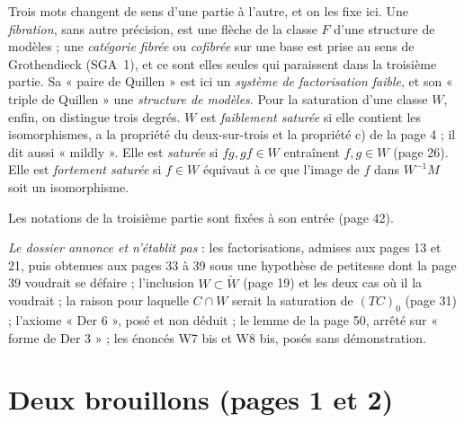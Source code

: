 \documentclass[11pt,a4paper]{article}
\begin{document}
Trois mots changent de sens d'une partie à l'autre, et on les fixe ici. Une
\emph{fibration}, sans autre précision, est une flèche de la classe $F$ d'une
structure de modèles ; une \emph{catégorie fibrée} ou \emph{cofibrée} sur une
base est prise au sens de Grothendieck (SGA~1), et ce sont elles seules qui
paraissent dans la troisième partie. Sa « paire de Quillen » est ici un
\emph{système de factorisation faible}, et son « triple de Quillen » une
\emph{structure de modèles}. Pour la saturation d'une classe $W$, enfin, on
distingue trois degrés. $W$ est \emph{faiblement saturée} si elle contient les
isomorphismes, a la propriété du deux-sur-trois et la propriété c) de la page
4 ; il dit aussi « mildly ». Elle est \emph{saturée} si $fg, gf \in W$
entraînent $f, g \in W$ (page 26). Elle est \emph{fortement saturée} si
$f \in W$ équivaut à ce que l'image de $f$ dans $W^{-1}M$ soit un
isomorphisme.

Les notations de la troisième partie sont fixées à son entrée (page 42).

\emph{Le dossier annonce et n'établit pas} : les factorisations, admises aux
pages 13 et 21, puis obtenues aux pages 33 à 39 sous une hypothèse de
petitesse dont la page 39 voudrait se défaire ; l'inclusion
$W \subset \widetilde W$ (page 19) et les deux cas où il la voudrait ; la
raison pour laquelle $C \cap W$ serait la saturation de $(TC)_0$ (page 31) ;
l'axiome « Der 6 », posé et non déduit ; le lemme de la page 50, arrêté sur
« forme de Der 3 » ; les énoncés W7 bis et W8 bis, posés sans démonstration.

\section*{Deux brouillons (pages 1 et 2)}
\end{document}
